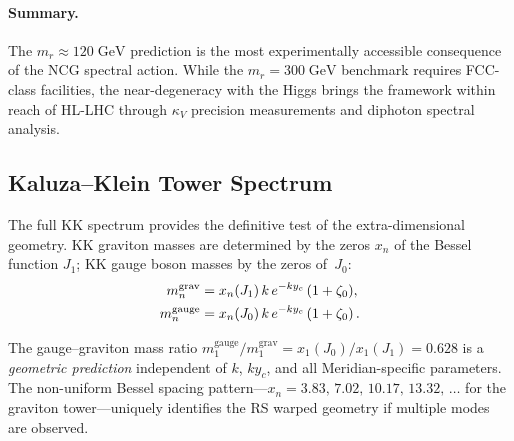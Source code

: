 \paragraph{Summary.}  The $m_r \approx 120\;\mathrm{GeV}$ prediction is the most experimentally accessible consequence of the NCG spectral action.  While the $m_r = 300\;\mathrm{GeV}$ benchmark requires FCC-class facilities, the near-degeneracy with the Higgs brings the framework within reach of HL-LHC through $\kappa_V$ precision measurements and diphoton spectral analysis.

\subsection{Kaluza--Klein Tower Spectrum}
\label{sec:4-kk-spectrum}

The full KK spectrum provides the definitive test of the extra-dimensional geometry.  KK graviton masses are determined by the zeros $x_n$ of the Bessel function $J_1$; KK gauge boson masses by the zeros of~$J_0$:
\begin{align}
  m_n^{\mathrm{grav}} &= x_n(J_1)\, k\, e^{-ky_c}\, (1 + \zeta_0),
  \label{eq:4-kk-masses}\\
  m_n^{\mathrm{gauge}} &= x_n(J_0)\, k\, e^{-ky_c}\, (1 + \zeta_0)\,.
  \notag
\end{align}

\begin{table}[htbp]
\centering
\caption{KK tower spectrum for standard RS1 parameters ($k = M_{\mathrm{Pl}}$, $ky_c = 35$).}
\label{tab:4-kk-spectrum}
\end{table}

The gauge--graviton mass ratio $m_1^{\mathrm{gauge}}/m_1^{\mathrm{grav}} = x_1(J_0)/x_1(J_1) = 0.628$ is a \emph{geometric prediction} independent of $k$, $ky_c$, and all Meridian-specific parameters.  The non-uniform Bessel spacing pattern---$x_n = 3.83,\, 7.02,\, 10.17,\, 13.32,\, \ldots$ for the graviton tower---uniquely identifies the RS warped geometry if multiple modes are observed.

